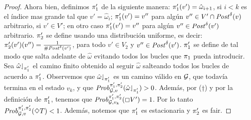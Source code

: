 \begin{proof}
  Ahora bien, definimos $\pi_{1}'$ de la siguiente manera:
  $\pi_{1}'(v') = \hat{\omega}_{i+1}$, si $i < k$ es el índice mas grande tal que $v' = \hat{\omega}_{i}$;
  $\pi_{1}'(v') = v''$ para algún $v'' \in
  V'\cap\mathit{Post}^\delta(v)$ arbitrario, si $v' \in V'$;
  en otro caso $\pi_{1}'(v') = v''$ para algún
  $v'' \in \mathit{Post}^\delta(v')$ arbitrario.
  $\pi_{2}'$ se define usando una distribución uniforme, es decir:
  $\pi_{2}'(v')(v'') = \frac{1}{\# \mathit{Post}^\delta(v')}$, para todo $v'
  \in V_2$ y $v'' \in \mathit{Post}^\delta(v')$.
  $\pi_{1}'$ se define de tal modo que salta adelante de $\hat{\omega}$
  evitando todos los bucles que $\pi_{1}$ pueda introducir.  Sea
  $\hat{\omega}{\downharpoonleft}_{\pi_{1}'}$ el camino finito obtenido al seguir $\hat{\omega}$ salteando todos los bucles de acuerdo a $\pi_{1}'$.
  Observemos que $\hat{\omega}{\downharpoonleft}_{\pi_{1}'}$ es un camino válido en $\mathcal{G}$, que todavía termina en el estado $v_k$, y que
  $\mathit{Prob}^{\pi_{1}',\pi_{2}'}_{\mathcal{G},v}({\hat{\omega}{\downharpoonleft}_{\pi_{1}'}})>0$.
  Además, por ($\dag$) y por la definición de $\pi_{1}'$, tenemos que $\mathit{Prob}^{\pi_{1}',\pi_{2}'}_{\mathcal{G}, v_k}(\Box V') = 1$.
  Por lo tanto $\mathit{Prob}^{\pi_{1}',\pi_{2}'}_{\mathcal{G}, v}(\Diamond T) < 1$.
  Además, notemos que $\pi_{1}'$ es estacionaria y $\pi_{2}'$
  es fair.
\qedhere
\end{proof} \\












